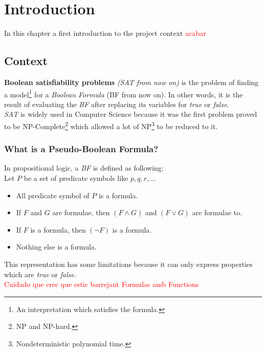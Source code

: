 \chapter{Introduction} %

\label{Chapter1} %

In this chapter a first introduction to the project context \textcolor{red}{acabar}

\section{Context}

\textbf{Boolean satisfiability problems} \textit{(SAT from now on)} is the problem of finding a model\footnote{An interpretation which satisfies the formula.} for a \emph{Boolean Formula} (BF from now on). In other words, it is the result of evaluating the \emph{BF} after replacing its variables for \emph{true} or \emph{false}. 
\\
\emph{SAT} is widely used in Computer Science because it was the first problem proved to be NP-Complete\cite{Cook1971}\footnote{NP and NP-hard.} which allowed a lot of NP\footnote{Nondeterministic polynomial time.} to be reduced to it.

\subsection{What is a Pseudo-Boolean Formula?}
In propositional logic, a \emph{BF} is defined as following\cite{Lpo}:\\
Let $P$ be a set of predicate symbols like $p,q,r,...$
\begin{itemize}
	\item All predicate symbol of $P$ is a formula.
	\item If $F$ and $G$ are formulae, then $(F \land G)$ and $(F \lor G)$ are formulae to.
	\item If $F$ is a formula, then $(\neg F)$ is a formula.
	\item Nothing else is a formula.
\end{itemize}
This representation has some limitations because it can only express properties which are \emph{true} or \emph{false}.\\

\textcolor{red}{Cuidado que crec que estic barrejant Formulas amb Functions}\\

